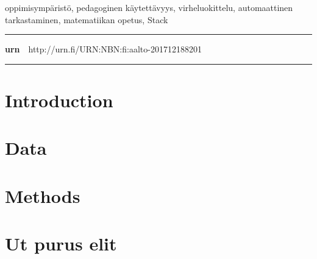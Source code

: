   \begin{spacing}{.88}
  {\parindent0pt %

  \parbox[t]{121.6mm}{\raggedright\small oppimisympäristö, pedagoginen käytettävyys, virheluokittelu, automaattinen tarkastaminen, matematiikan opetus, Stack}

  \vspace{.5mm}\rule{\textwidth}{.75pt}

  {\fontsize{10.5pt}{10.5pt}\bfseries\sffamily\lsstyle urn}~~{\small http://urn.fi/URN:NBN:fi:aalto-201712188201}

  \vspace{-2.4mm}\rule{\textwidth}{.75pt}

  } %
  \end{spacing}

  \restoregeometry  %




  \newpage

  \tableofcontents


  \newpage


  \chapter{Introduction}
  

  \chapter{Data}
  
  \chapter{Methods}
  


  
  




  \appendix

  \chapter{Ut purus elit}


